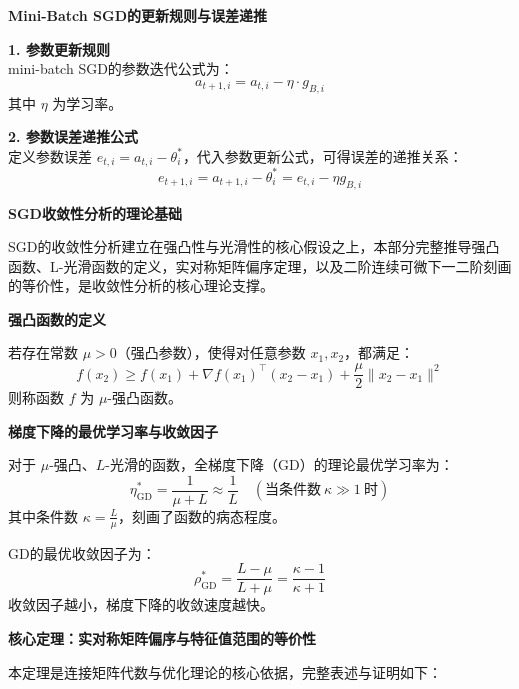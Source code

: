 \documentclass[10pt]{article}
\numberwithin{equation}{section}
\theoremstyle{plain}
\theoremstyle{definition}
\theoremstyle{remark}
\begin{document}
{\par\vspace{0.8ex}\noindent\normalsize\bfseries\color{secblue} Mini-Batch SGD的更新规则与误差递推\par}
\textbf{1. 参数更新规则}\\
mini-batch SGD的参数迭代公式为：
\[ \displaystyle a_{t+1,i} = a_{t,i} - \eta \cdot g_{B,i} \tag{39} \]
其中 $\eta$ 为学习率。

\textbf{2. 参数误差递推公式}\\
定义参数误差 $e_{t,i} = a_{t,i} - \theta^*_i$，代入参数更新公式，可得误差的递推关系：
\[ \displaystyle e_{t+1,i} = a_{t+1,i} - \theta^*_i = e_{t,i} - \eta g_{B,i} \tag{4.5.1} \]

{\par\vspace{1ex}\noindent\large\bfseries\color{brandD} SGD收敛性分析的理论基础\par}\par\vspace{0.5ex}
SGD的收敛性分析建立在强凸性与光滑性的核心假设之上，本部分完整推导强凸函数、L-光滑函数的定义，实对称矩阵偏序定理，以及二阶连续可微下一二阶刻画的等价性，是收敛性分析的核心理论支撑。

{\par\vspace{0.8ex}\noindent\normalsize\bfseries\color{secblue} 强凸函数的定义\par}
若存在常数 $\mu > 0$（强凸参数），使得对任意参数 $x_1, x_2$，都满足：
\[ \displaystyle f(x_2) \geq f(x_1) + \nabla f(x_1)^\top (x_2 - x_1) + \frac{\mu}{2}\|x_2 - x_1\|^2 \tag{4.6.1} \]
则称函数 $f$ 为 $\mu$-强凸函数。

{\par\vspace{0.8ex}\noindent\normalsize\bfseries\color{secblue} 梯度下降的最优学习率与收敛因子\par}
对于 $\mu$-强凸、$L$-光滑的函数，全梯度下降（GD）的理论最优学习率为：
\[ \displaystyle \eta^*_{\text{GD}} = \frac{1}{\mu + L} \approx \frac{1}{L} \quad (\text{当条件数}\ \kappa \gg 1\ \text{时}) \tag{4.6.6} \]
其中条件数 $\displaystyle \kappa = \frac{L}{\mu}$，刻画了函数的病态程度。

GD的最优收敛因子为：
\[ \displaystyle \rho^*_{\text{GD}} = \frac{L - \mu}{L + \mu} = \frac{\kappa - 1}{\kappa + 1} \]
收敛因子越小，梯度下降的收敛速度越快。

{\par\vspace{0.8ex}\noindent\normalsize\bfseries\color{secblue} 核心定理：实对称矩阵偏序与特征值范围的等价性\par}
本定理是连接矩阵代数与优化理论的核心依据，完整表述与证明如下：
\end{document}
